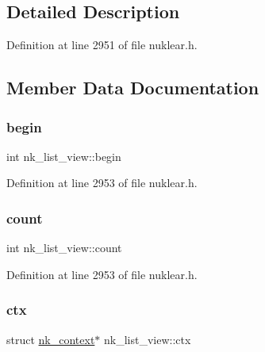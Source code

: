 \subsection{Detailed Description}


Definition at line 2951 of file nuklear.\+h.



\subsection{Member Data Documentation}
\mbox{\label{structnk__list__view_aa4879e58fcd4a3d28bd7bff09cdf5624}} 
\subsubsection{\texorpdfstring{begin}{begin}}
{\footnotesize\ttfamily int nk\+\_\+list\+\_\+view\+::begin}



Definition at line 2953 of file nuklear.\+h.

\mbox{\label{structnk__list__view_a665f64779d41052ee4a203b9ae785e8e}} 
\subsubsection{\texorpdfstring{count}{count}}
{\footnotesize\ttfamily int nk\+\_\+list\+\_\+view\+::count}



Definition at line 2953 of file nuklear.\+h.

\mbox{\label{structnk__list__view_aeb23229308cd613e95cf1164f26ab8f9}} 
\subsubsection{\texorpdfstring{ctx}{ctx}}
{\footnotesize\ttfamily struct \mbox{\hyperlink{structnk__context}{nk\+\_\+context}}$\ast$ nk\+\_\+list\+\_\+view\+::ctx}



